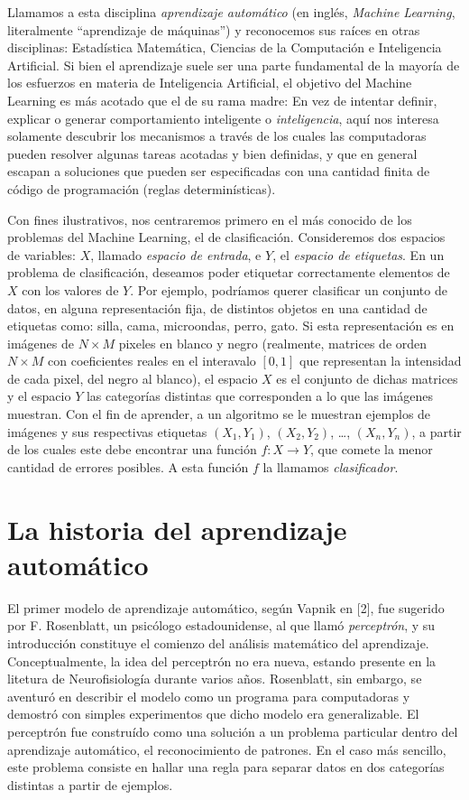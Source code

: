 \documentclass{article}
\begin{document}
Llamamos a esta disciplina \textit{aprendizaje automático} (en inglés, \textit{Machine Learning}, literalmente ``aprendizaje de máquinas'') y reconocemos
sus raíces en otras disciplinas: Estadística Matemática, Ciencias de la Computación e Inteligencia Artificial. Si bien el aprendizaje suele ser una
parte fundamental de la mayoría de los esfuerzos en materia de Inteligencia Artificial, el objetivo del Machine Learning es más acotado que el de su 
rama madre: En vez de intentar definir, explicar o generar comportamiento inteligente o \textit{inteligencia}, aquí nos interesa solamente descubrir los mecanismos
a través de los cuales las computadoras pueden resolver algunas tareas acotadas y bien definidas, y que en general escapan a soluciones que pueden
ser especificadas con una cantidad finita de código de programación (reglas determinísticas).

Con fines ilustrativos, nos centraremos primero en el más conocido de los problemas del Machine Learning, el de clasificación. Consideremos dos espacios
de variables: \(X\), llamado \textit{espacio de entrada}, e \(Y\), el  \textit{espacio de etiquetas}. En un problema de clasificación, deseamos poder etiquetar
correctamente elementos de \(X\) con los valores de \(Y\). Por ejemplo, podríamos querer clasificar un conjunto de datos, en alguna representación fija, de distintos 
objetos en una cantidad de etiquetas como: silla, cama, microondas, perro, gato. Si esta representación es en imágenes de \(N\times M\) pixeles en blanco y negro (realmente, 
matrices de orden \(N\times M\) con coeficientes reales en el interavalo \([0,1]\) que representan la intensidad de cada pixel, del negro al blanco), el espacio \(X\) es 
el conjunto de dichas matrices y el espacio \(Y\) las categorías distintas que corresponden a lo que las imágenes muestran. Con el fin de aprender, a un algoritmo se le 
muestran ejemplos de imágenes y sus respectivas etiquetas \((X_1,Y_1)\), \((X_2,Y_2)\), \dots, \((X_n,Y_n)\), a partir de los cuales este debe encontrar una función
\(f: X\rightarrow Y\), que comete la menor cantidad de errores posibles. A esta función \(f\) la llamamos \textit{clasificador}.

\section{La historia del aprendizaje automático}

El primer modelo de aprendizaje automático, según Vapnik en [2], fue sugerido por F. Rosenblatt, un psicólogo estadounidense, al que llamó \textit{perceptrón}, y su introducción
constituye el comienzo del análisis matemático del aprendizaje. Conceptualmente, la idea del perceptrón no era nueva, estando presente en la litetura de Neurofisiología durante
varios años. Rosenblatt, sin embargo, se aventuró en describir el modelo como un programa para computadoras y demostró con simples experimentos que dicho modelo era generalizable.
El perceptrón fue construído como una solución a un problema particular dentro del aprendizaje automático, el reconocimiento de patrones. En el caso más sencillo, este problema
consiste en hallar una regla para separar datos en dos categorías distintas a partir de ejemplos.
\end{document}

